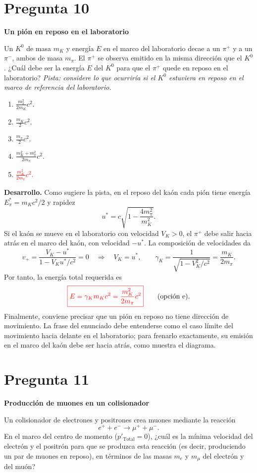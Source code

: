 \documentclass[a4paper,11pt]{article}
\newcommand{\pregunta}[2]{\section*{Pregunta #1}\textbf{#2}\par}
\begin{document}
\pregunta{10}{Un pión en reposo en el laboratorio}

Un $K^0$ de masa $m_K$ y energía $E$ en el marco del laboratorio decae a un $\pi^+$ y a un $\pi^-$, ambos de masa $m_\pi$. El $\pi^+$ se observa emitido en la misma dirección que el $K^0$. ¿Cuál debe ser la energía $E$ del $K^0$ para que el $\pi^+$ quede en reposo en el laboratorio? \emph{Pista: considere lo que ocurriría si el $K^0$ estuviera en reposo en el marco de referencia del laboratorio.}

\begin{enumerate}[itemsep=0.3em]
    \item $\displaystyle \frac{m_\pi^2}{2m_K}c^2$.
    \item $\displaystyle \frac{m_K}{2}c^2$.
    \item $\displaystyle \frac{m_\pi}{2}c^2$.
    \item $\displaystyle \frac{m_K^2+m_\pi^2}{2m_\pi}c^2$.
    \item \textcolor{red}{$\displaystyle \frac{m_K^2}{2m_\pi}c^2$.}
\end{enumerate}

\begin{figure}[H]
\centering

\end{figure}

\textbf{Desarrollo.} Como sugiere la pista, en el reposo del kaón cada pión tiene energía $E_\pi^*=m_Kc^2/2$ y rapidez
\[
u^*=c\sqrt{1-\frac{4m_\pi^2}{m_K^2}}.
\]
Si el kaón se mueve en el laboratorio con velocidad $V_K>0$, el $\pi^+$ debe salir hacia atrás en el marco del kaón, con velocidad $-u^*$. La composición de velocidades da
\[
v_+=\frac{V_K-u^*}{1-V_Ku^*/c^2}=0
\quad\Longrightarrow\quad V_K=u^*,
\qquad
\gamma_K=\frac{1}{\sqrt{1-V_K^2/c^2}}=\frac{m_K}{2m_\pi}.
\]
Por tanto, la energía total requerida es
\[
\textcolor{red}{\boxed{E=\gamma_Km_Kc^2=\frac{m_K^2}{2m_\pi}c^2}}
\qquad\text{(opción e).}
\]
Finalmente, conviene precisar que un pión en reposo no tiene dirección de movimiento. La frase del enunciado debe entenderse como el caso límite del movimiento hacia delante en el laboratorio; para frenarlo exactamente, su emisión en el marco del kaón debe ser hacia atrás, como muestra el diagrama.
\parencite[Sec. 5.2, pp. 132--138; Sec. 5.4, pp. 158--159]{chaparro2026}

\pregunta{11}{Producción de muones en un colisionador}

Un colisionador de electrones y positrones crea muones mediante la reacción
\[
e^+ + e^- \longrightarrow \mu^+ + \mu^-.
\]
En el marco del centro de momento ($p'_{\mathrm{Total}}=0$), ¿cuál es la mínima velocidad del electrón y el positrón para que se produzca esta reacción (es decir, produciendo un par de muones en reposo), en términos de las masas $m_e$ y $m_\mu$ del electrón y del muón?
\end{document}
